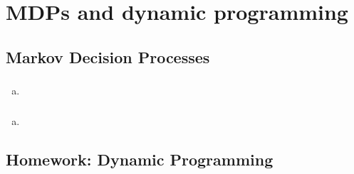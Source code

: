 \documentclass{article}
\begin{document}
\section{MDPs and dynamic programming}
\subsection{Markov Decision Processes}
\subsubsection{}
\begin{enumerate}[(a)]
  \item
\end{enumerate}

\subsubsection{}
\begin{enumerate}[(a)]
  \item
\end{enumerate}

\subsection{Homework: Dynamic Programming}
\subsubsection{}

\subsubsection{}

\subsubsection{}

\subsubsection{}
\end{document}
